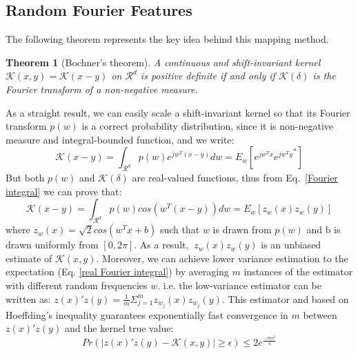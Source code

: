 \subsection{Random Fourier Features}
The following theorem represents the key idea behind this mapping method.
\newtheorem{theorem}{Theorem}
\begin{theorem}[Bochner's theorem]
A continuous and shift-invariant kernel $\mathcal{K}(x,y)=\mathcal{K}(x-y)$ on $\mathcal{R}^d$ is positive definite if and only if $\mathcal{K}(\delta)$ is the Fourier transform of a non-negative measure.
\end{theorem}
As a straight result, we can easily scale a shift-invariant kernel so that its Fourier transform $p(w)$ is a correct probability distribution, since it is non-negative measure and integral-bounded function, and we write:
\begin{equation}
\label{Fourier integral}
\mathcal{K}(x-y)=\int_{\mathcal{R}^d}p(w)e^{jw^T(x-y)}dw=E_w[e^{jw^Tx}{e^{jw^Ty}}^*]
\end{equation}
But both $p(w)$ and $\mathcal{K}(\delta)$ are real-valued functions, thus from Eq.~\ref{Fourier integral} we can prove that:
\begin{equation}
\label{real Fourier integral}
\mathcal{K}(x-y)=\int_{\mathcal{R}^d}p(w)cos({w^T(x-y)})dw=E_w[z_w(x)z_w(y)]
\end{equation}
where $z_w(x)=\sqrt{2}cos(w^Tx+b)$ such that $w$ is drawn from $p(w)$ and b is drawn uniformly from $[0,2\pi]$.\newline
As a result, $\ z_w(x)z_w(y)$ is an unbiased estimate of $\mathcal{K}(x,y)$. Moreover, we can achieve lower variance estimation to the expectation (Eq. \ref{real Fourier integral}) by averaging $m$ instances of the estimator with different random frequencies $w$. i.e. the low-variance estimator can be written as: $z(x)'z(y)=\frac{1}{m} \Sigma_{j=1}^m z_{w_j}(x)z_{w_j}(y)$. This estimator and based on Hoeffding's inequality guarantees exponentially fast convergence in $m$ between $z(x)'z(y)$ and the kernel true value:
\begin{equation}
    Pr(|z(x)'z(y)-\mathcal{K}(x,y)|\geq\epsilon)\leq2e^\frac{-m\epsilon^2}{4}
\end{equation}

